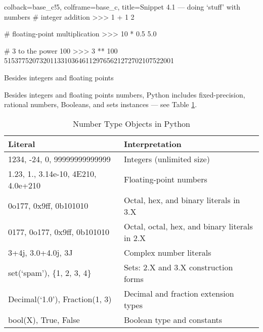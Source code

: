 \documentclass[a4paper,11pt]{book}
\numberwithin{figure}{chapter}
\numberwithin{table}{chapter}
\newcommand{\question}[1]{%
    \begin{tcolorbox}[colback=comp_c!10,colframe=comp_c,sidebyside align=top,width=\linewidth,before skip=1ex]
        #1
    \end{tcolorbox}%
    \switchcolumn%
}
\newcommand{\note}[1]{%
    \begin{tcolorbox}[colback=white!0,colframe=white!10,width=\linewidth,before skip=1ex]
        #1
    \end{tcolorbox}         
}
\begin{document}
\begin{pythoncode}[linenos=true,]{colback=base_c!5, colframe=base_c, title=\sffamily Snippet 4.1 --- doing `stuff' with numbers}
# integer addition
>>> 1 + 1
2
	
# floating-point multiplication
>>> 10 * 0.5
5.0
	
# 3 to the power 100
>>> 3 ** 100
515377520732011331036461129765621272702107522001
	
\end{pythoncode}

\begin{paracol}{2}
	\question{\raggedright Besides integers and floating points}
    \note{Besides integers and floating points numbers, Python includes fixed-precision, rational numbers, Booleans, and sets instances --- see Table \ref{tab:number_types_in_python}.}
\end{paracol}

\begin{table}[!htbp]
	\centering
	\caption{Number Type Objects in Python}
	\label{tab:number_types_in_python}
	\begin{tabular}{ll}
		\toprule \toprule
		Literal & Interpretation\\
		\midrule
		 1234, -24, 0, 99999999999999 & Integers (unlimited size)\\
		 1.23, 1., 3.14e-10, 4E210, 4.0e+210 & Floating-point numbers \\
		 0o177, 0x9ff, 0b101010 & Octal, hex, and binary literals in 3.X \\
		 0177, 0o177, 0x9ff, 0b101010 & Octal, octal, hex, and binary literals in 2.X \\
		 3+4j, 3.0+4.0j, 3J & Complex number literals \\
		 set(`spam'), \{1, 2, 3, 4\} & Sets: 2.X and 3.X construction forms\\ Decimal(`1.0'), Fraction(1, 3) & Decimal and fraction extension types\\ 
		 bool(X), True, False & Boolean type and constants\\
		 \bottomrule
	\end{tabular}
\end{table}
\end{document}
